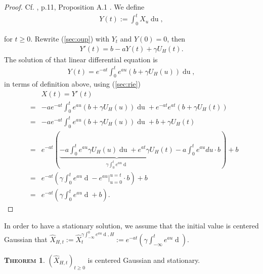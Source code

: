 \documentclass[a4paper, twoside, 11pt]{article}
\theoremstyle{definition}
\newtheorem{theorem}[definition]{\scshape Theorem}
\newcommand{\brkt}[1]{\left({#1} \right)}
\begin{document}
  \begin{proof}
	Cf. \cite{chriel}, p.11, Proposition A.1 . We define
	\begin{eqnarray*}
	  Y(t):=\int_0^t X_u \mathop{du},
	\end{eqnarray*}
   
   for $t\ge 0$. Rewrite (\ref{sec:oup}) with $Y_t$ and $Y(0)=0$, then
	\begin{eqnarray*}
	  Y'(t) = b - aY(t) + \gamma U_H(t).
	\end{eqnarray*}
    The solution of that linear differential equation is
	\begin{eqnarray*}
	  Y(t) = e^{-at}\int_0^t e^{au}(b+\gamma U_H(u)) \mathop{du},
	\end{eqnarray*}
	in terms of definition above, using (\ref{sec:rie})
	  \begin{eqnarray*}
	  &&X(t) =  Y'(t)\\
	  &=& -ae^{-at}\int_0^t e^{au}(b+\gamma U_H(u)) \mathop{du} + e^{-at}e^{at}(b+\gamma U_H(t)) \\
	  &=&  -ae^{-at}\int_0^t e^{au}(b+\gamma U_H(u)) \mathop{du} + b +\gamma U_H(t)\\
	  &=& e^{-at} \brkt{\underbrace{-a\int_0^t e^{au} \gamma U_H(u) \mathop{du} + e^{at}\gamma U_H(t)}_{\gamma\int_0^t e^{au} \mathop{dU_H(u)}} -a\int_0^t e^{au} du \cdot b } + b\\
	&=&  e^{-at} \brkt{\gamma\int_0^t e^{au} \mathop{dU_H(u)} - e^{au}|^{u=t}_{u=0} \cdot b } + b\\
	&=&  e^{-at} \brkt{\gamma\int_0^t e^{au} \mathop{dU_H(u)} + b}.
	  \end{eqnarray*}
  \end{proof}

  In order to have a stationary solution, we assume that the initial value is centered Gaussian that $\hat{X}_{H,t}:= \hat{X}_t^{\gamma\int_{-\infty}^0 e^{au}\mathop{dU_H(u)}, H} := e^{-at}\brkt{\gamma\int_{-\infty}^t e^{au}\mathop{dU_H(u)}}$.
  \begin{theorem}
	$(\hat{X}_{H,t})_{t\ge 0}$ is centered Gaussian and stationary.
	\label{sec:gsp}
  \end{theorem}
\end{document}
